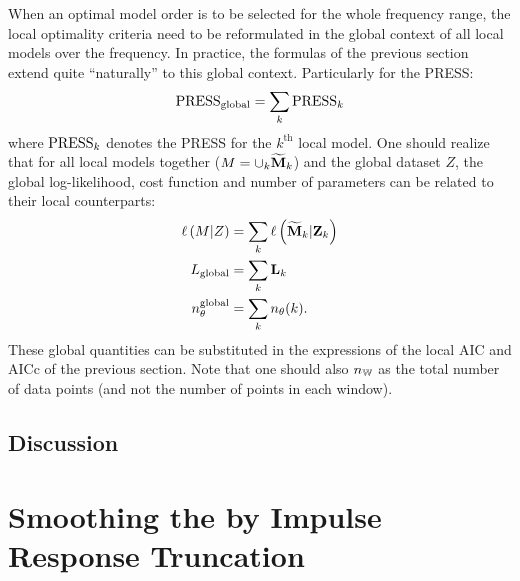 When an optimal model order is to be selected for the whole frequency range, the local optimality criteria need to be reformulated in the global context of all local models over the frequency.
In practice, the formulas of the previous section extend quite ``naturally'' to this global context.
Particularly for the \gls{PRESS}:
\begin{equation}
  \PRESS_{\mathrm{global}} = \sum_k \PRESS_k
\end{equation}
where $\PRESS_k$ denotes the \gls{PRESS} for the $k^{\text{th}}$ local model.
One should realize that for all local models together ($M =  \cup_k \LocalModel[k]{M}$) and the global dataset $Z$, the global log-likelihood, cost function and number of parameters can be related to their local counterparts:
\begin{align}
  \loglikelihood{M | Z}   &= \sum_k \loglikelihood{\LocalModel[k]{M} | \LocalVector{Z}_{k}} \\
  L_{\mathrm{global}} &= \sum_k \LocalVector{L}_k\\
  \nth^{\mathrm{global}} &= \sum_k \nth(k)
  \text{.}
\end{align}
These global quantities can be substituted in the expressions of the local \gls{AIC} and \gls{AICc} of the previous section. 
Note that one should also $\nWind$ as the total number of data points (and not the number of points in each window).

\subsection{Discussion}


\section{Smoothing the  by Impulse Response Truncation}


